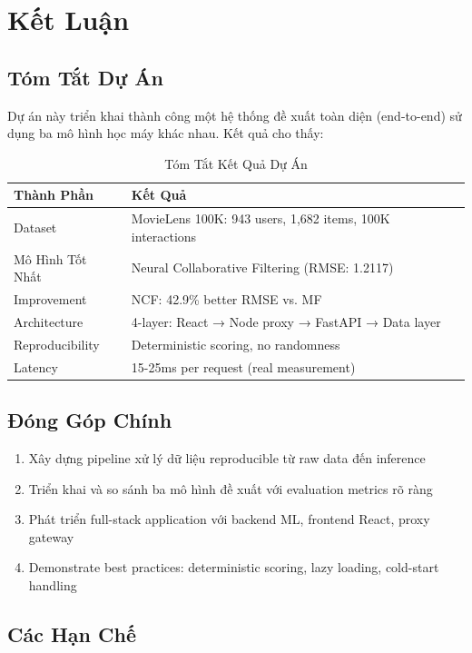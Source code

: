 \documentclass[12pt,a4paper]{article}
\begin{document}
\section{Kết Luận}

\subsection{Tóm Tắt Dự Án}

Dự án này triển khai thành công một hệ thống đề xuất toàn diện (end-to-end) sử dụng ba mô hình học máy khác nhau. Kết quả cho thấy:

\begin{table}[H]
\centering
\begin{tabular}{|l|l|}
\hline
\textbf{Thành Phần} & \textbf{Kết Quả} \\
\hline
Dataset & MovieLens 100K: 943 users, 1,682 items, 100K interactions \\
\hline
Mô Hình Tốt Nhất & Neural Collaborative Filtering (RMSE: 1.2117) \\
\hline
Improvement & NCF: 42.9\% better RMSE vs. MF \\
\hline
Architecture & 4-layer: React → Node proxy → FastAPI → Data layer \\
\hline
Reproducibility & Deterministic scoring, no randomness \\
\hline
Latency & 15-25ms per request (real measurement) \\
\hline
\end{tabular}
\caption{Tóm Tắt Kết Quả Dự Án}
\end{table}

\subsection{Đóng Góp Chính}

\begin{enumerate}
    \item Xây dựng pipeline xử lý dữ liệu reproducible từ raw data đến inference
    \item Triển khai và so sánh ba mô hình đề xuất với evaluation metrics rõ ràng
    \item Phát triển full-stack application với backend ML, frontend React, proxy gateway
    \item Demonstrate best practices: deterministic scoring, lazy loading, cold-start handling
\end{enumerate}

\subsection{Các Hạn Chế}
\end{document}
